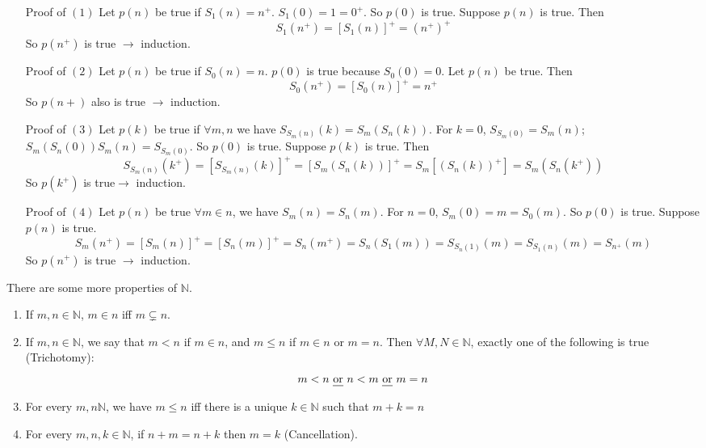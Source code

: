 \documentclass[12pt]{amsart}
\newcommand{\bbN}{\mathbb{N}}
\theoremstyle{plain}
\theoremstyle{remark}
\theoremstyle{definition}
\begin{document}
\begin{enumerate}
	\item [Proof of $(1)$]
	Let $p(n)$ be true if $S_1(n) = n^+$. $S_1(0) = 1 = 0^+$. So $p(0)$ is true. Suppose $p(n)$ is true. Then
	\begin{equation*}
	S_1(n^+) = \left[ S_1(n) \right]^+ = (n^+)^+
	\end{equation*}
	So $p(n^+)$ is true $\rightarrow$ induction.

	\item [Proof of $(2)$]
	Let $p(n)$ be true if $S_0(n) = n$. $p(0)$ is true because $S_0(0) = 0$. Let $p(n)$ be true. Then 
	\begin{equation*}
	S_0(n^+) = \left[ S_0(n) \right]^+ = n^+
	\end{equation*}
	So $p(n+)$ also is true $\rightarrow $ induction.

	\item[Proof of $(3)$]
	Let $p(k)$ be true if $\forall m, n$ we have $S_{S_m(n)}(k) = S_m\left( S_n(k) \right)$.
	For $k=0$, $S_{S_m(0)} = S_m(n)$; $S_m(S_{n}(0)) S_m(n) = S_{S_m(0)}$. So $p(0)$ is true. Suppose $p(k)$ is true. Then 
	\begin{equation*}
		S_{S_m(n)}(k^+) = \left[ S_{S_m(n)}(k) \right]^+ = \left[ S_m(S_n(k)) \right]^+ = S_m\left[ \left( S_n(k) \right)^+ \right] = S_m\left( S_n(k^+) \right)
	\end{equation*}
	So $p(k^+)$ is true$\rightarrow$ induction.

	\item[Proof of $(4)$] 
	Let $p(n)$ be true $\forall m \in n$, we have $S_m(n) = S_n(m)$.
	For $n = 0$, $S_m(0) = m = S_0(m)$. So $p(0)$ is true. Suppose $p(n)$ is true.
	\begin{equation*}
	S_m(n^+) = \left[ S_m(n) \right]^+ = \left[ S_n(m) \right]^+ = S_n(m^+) = S_n(S_1(m)) = S_{S_n(1)}(m) = S_{S_1(n)}(m) = S_{n^+}(m)
	\end{equation*}
	So $p(n^+)$ is true $\rightarrow$ induction.
\end{enumerate}

	\hfill
	\par
	There are some more properties of $\bbN$.
	\begin{enumerate}[(1)]
		\item 
		If $m, n \in \bbN$, $m \in n $ iff $m \subsetneq n$. 

		\item 
		If $m, n\in \bbN$, we say that $m < n$ if $m \in n$, and $m \leq n$ if $m \in n$ or $m = n$. Then $\forall M, N\in \bbN$, exactly one of the following is true  (Trichotomy):
		\begin{equation*}
			m < n \text{ \ul{or} } n < m \text{ \ul{or} } m = n
		\end{equation*}

		\item
		For every $m, n \bbN$, we have $m \leq n$ iff there is a unique $k \in \bbN$ such that $m+k = n$

		\item
		For every $m, n, k \in \bbN$, if $n+m = n+k$ then $m = k$ (Cancellation). 
	\end{enumerate}
\end{document}
